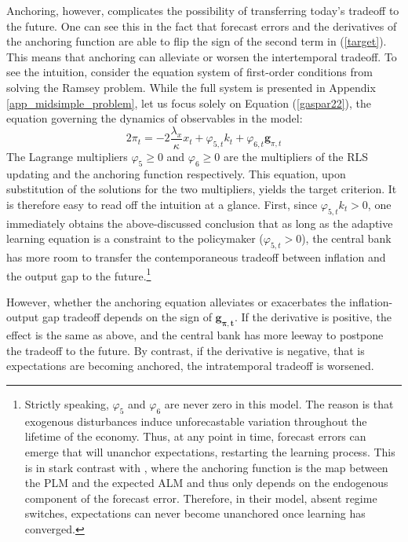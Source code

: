 \documentclass[11pt]{article}
\renewcommand{\[}{\begin{equation}}
\renewcommand{\]}{\end{equation}}
\begin{document}
Anchoring, however, complicates the possibility of transferring today's tradeoff to the future. One can see this in the fact that forecast errors and the derivatives of the anchoring function are able to flip the sign of the second term in (\ref{target}). This means that anchoring can alleviate or worsen the intertemporal tradeoff. To see the intuition, consider the equation system of first-order conditions from solving the Ramsey problem. While the full system is presented in Appendix \ref{app_midsimple_problem}, let us focus solely on Equation (\ref{gaspar22}), the equation governing the dynamics of observables in the model:
\begin{equation}
2\pi_t = - 2\frac{\lambda_x}{\kappa}x_t +\varphi_{5,t} k_t + \varphi_{6,t} \mathbf{g}_{\pi,t} 
\end{equation}
The Lagrange multipliers $\varphi_5 \geq 0$ and $\varphi_6 \geq 0$ are the multipliers of the RLS updating and the anchoring function respectively. This equation, upon substitution of the solutions for the two multipliers, yields the target criterion. It is therefore easy to read off the intuition at a glance. First, since $\varphi_{5,t}k_t > 0$, one immediately obtains the above-discussed conclusion that as long as the adaptive learning equation is a constraint to the policymaker ($\varphi_{5,t} > 0$), the central bank has more room to transfer the contemporaneous tradeoff between inflation and the output gap to the future.\footnote{Strictly speaking, $\varphi_5$ and $\varphi_6$ are never zero in this model. The reason is that exogenous disturbances induce unforecastable variation throughout the lifetime of the economy. Thus, at any point in time, forecast errors can emerge that will unanchor expectations, restarting the learning process. This is in stark contrast with \cite{carvalho2019anchored}, where the anchoring function is the map between the PLM and the expected ALM and thus only depends on the endogenous component of the forecast error. Therefore, in their model, absent regime switches, expectations can never become unanchored once learning has converged.}

However, whether the anchoring equation alleviates or exacerbates the inflation-output gap tradeoff depends on the sign of $\mathbf{g_{\pi,t}}$. If the derivative is positive, the effect is the same as above, and the central bank has more leeway to postpone the tradeoff to the future. By contrast, if the derivative is negative, that is expectations are becoming anchored, the intratemporal tradeoff is worsened.
\end{document}
